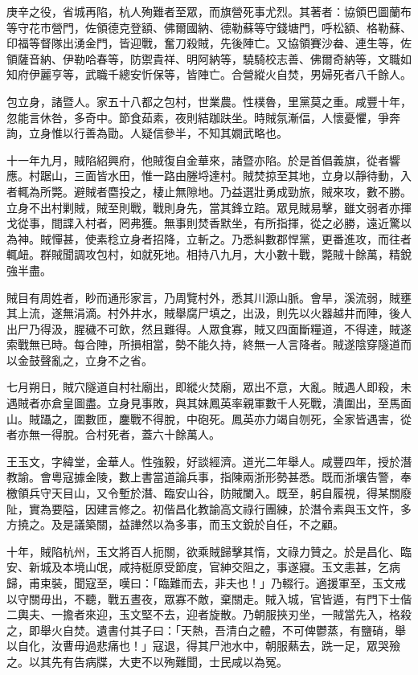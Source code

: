 \begin{pinyinscope}
庚辛之役，省城再陷，杭人殉難者至眾，而旗營死事尤烈。其著者：協領巴圖蘭布等守花市營門，佐領德克登額、佛爾國納、德勒蘇等守錢塘門，呼松額、格勒蘇、印福等督隊出湧金門，皆迎戰，奮刀殺賊，先後陣亡。又協領賽沙畚、連生等，佐領薩音納、伊勒哈春等，防禦貴祥、明阿納等，驍騎校志善、佛爾奇納等，文職如知府伊麗亨等，武職千總安忻保等，皆陣亡。合營縱火自焚，男婦死者八千餘人。

包立身，諸暨人。家五十八都之包村，世業農。性樸魯，里黨莫之重。咸豐十年，忽能言休咎，多奇中。節食茹素，夜則結跏趺坐。時賊氛漸偪，人懷憂懼，爭奔詢，立身惟以行善為勖。人疑信參半，不知其嫺武略也。

十一年九月，賊陷紹興府，他賊復自金華來，諸暨亦陷。於是首倡義旗，從者響應。村踞山，三面皆水田，惟一路由塍埒達村。賊焚掠至其地，立身以靜待動，入者輒為所斃。避賊者麕投之，棲止無隙地。乃益選壯勇成勁旅，賊來攻，數不勝。立身不出村剿賊，賊至則戰，戰則身先，當其鋒立踣。眾見賊易擊，雖文弱者亦揮戈從事，間諜入村者，罔弗獲。無事則焚香默坐，有所指揮，從之必勝，遠近驚以為神。賊憚甚，使素稔立身者招降，立斬之。乃悉糾數郡悍黨，更番進攻，而往者輒衄。群賊聞調攻包村，如就死地。相持八九月，大小數十戰，斃賊十餘萬，精銳強半盡。

賊目有周姓者，眇而通形家言，乃周覽村外，悉其川源山脈。會旱，溪流弱，賊壅其上流，遂無涓滴。村外井水，賊舉腐尸填之，出汲，則先以火器越井而陣，後人出尸乃得汲，腥穢不可飲，然且難得。人眾食寡，賊又四面斷糧道，不得達，賊遂索戰無已時。每合陣，所損相當，勢不能久持，終無一人言降者。賊遂陰穿隧道而以金鼓聲亂之，立身不之省。

七月朔日，賊穴隧道自村社廟出，即縱火焚廟，眾出不意，大亂。賊遇人即殺，未遇賊者亦倉皇圖盡。立身見事敗，與其妹鳳英率親軍數千人死戰，潰圍出，至馬面山。賊躡之，圍數匝，鏖戰不得脫，中砲死。鳳英亦力竭自刎死，全家皆遇害，從者亦無一得脫。合村死者，蓋六十餘萬人。

王玉文，字緯堂，金華人。性強毅，好談經濟。道光二年舉人。咸豐四年，授於潛教諭。會粵寇據金陵，數上書當道論兵事，指陳兩浙形勢甚悉。既而浙壤告警，奉檄領兵守天目山，又令塹於潛、臨安山谷，防賊闌入。既至，躬自履視，得某關廢阯，實為要隘，因建言修之。初偕昌化教諭高文祿行團練，於潛令素與玉文忤，多方撓之。及是議築關，益譁然以為多事，而玉文銳於自任，不之顧。

十年，賊陷杭州，玉文將百人扼關，欲乘賊歸擊其惰，文祿力贊之。於是昌化、臨安、新城及本境山氓，咸持梃原受節度，官紳交阻之，事遂寢。玉文恚甚，乞病歸，甫束裝，聞寇至，嘆曰：「臨難而去，非夫也！」乃輟行。適援軍至，玉文戒以守關毋出，不聽，戰五晝夜，眾寡不敵，棄關走。賊入城，官皆遁，有門下士偕二輿夫、一擔者來迎，玉文堅不去，迎者旋散。乃朝服挾刃坐，一賊當先入，格殺之，即舉火自焚。遺書付其子曰：「天熱，吾清白之體，不可俾鬱蒸，有鹽硝，舉以自化，汝曹毋過悲痛也！」寇退，得其尸池水中，朝服爇去，跣一足，眾哭殮之。以其先有告病牒，大吏不以殉難聞，士民咸以為冤。


\end{pinyinscope}

